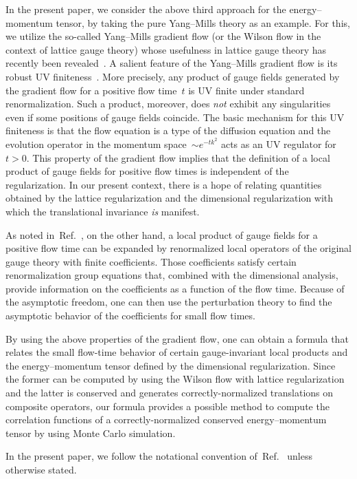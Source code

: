In the present paper, we consider the above third approach for the
energy--momentum tensor, by taking the pure Yang--Mills theory as an example.
For this, we utilize the so-called Yang--Mills gradient flow (or the Wilson
flow in the context of lattice gauge theory) whose usefulness in lattice gauge
theory has recently been revealed~\cite{Luscher:2010iy,Luscher:2010we,%
Luscher:2011bx,Borsanyi:2012zs,Borsanyi:2012zr,Fodor:2012td,Fodor:2012qh,%
Fritzsch:2013je,Luscher:2013cpa}. A salient feature of the Yang--Mills gradient
flow is its robust UV finiteness~\cite{Luscher:2011bx}. More precisely, any
product of gauge fields generated by the gradient flow for a positive flow
time~$t$ is UV finite under standard renormalization. Such a product, moreover,
does \emph{not\/} exhibit any singularities even if some positions of gauge
fields coincide. The basic mechanism for this UV finiteness is that the flow
equation is a type of the diffusion equation and the evolution operator in the
momentum space~$\sim e^{-tk^2}$ acts as an UV regulator for~$t>0$. This property
of the gradient flow implies that the definition of a local product of gauge
fields for positive flow times is independent of the regularization. In our
present context, there is a hope of relating quantities obtained by the lattice
regularization and the dimensional regularization with which the translational
invariance \emph{is\/} manifest.

As noted in~Ref.~\cite{Luscher:2011bx}, on the other hand, a local product of
gauge fields for a positive flow time can be expanded by renormalized local
operators of the original gauge theory with finite coefficients. Those
coefficients satisfy certain renormalization group equations that, combined
with the dimensional analysis, provide information on the coefficients as a
function of the flow time. Because of the asymptotic freedom, one can then
use the perturbation theory to find the asymptotic behavior of the coefficients
for small flow times.

By using the above properties of the gradient flow, one can obtain a formula
that relates the small flow-time behavior of certain gauge-invariant local
products and the energy--momentum tensor defined by the dimensional
regularization. Since the former can be computed by using the Wilson flow with
lattice regularization~\cite{Luscher:2010iy,Luscher:2010we,Luscher:2011bx,%
Borsanyi:2012zs,Borsanyi:2012zr,Fodor:2012td,Fodor:2012qh,Fritzsch:2013je,%
Luscher:2013cpa} and the latter is conserved and generates correctly-normalized
translations on composite operators, our formula provides a possible method to
compute the correlation functions of a correctly-normalized conserved
energy--momentum tensor by using Monte Carlo simulation.

In the present paper, we follow the notational convention
of~Ref.~\cite{Luscher:2011bx} unless otherwise stated.
